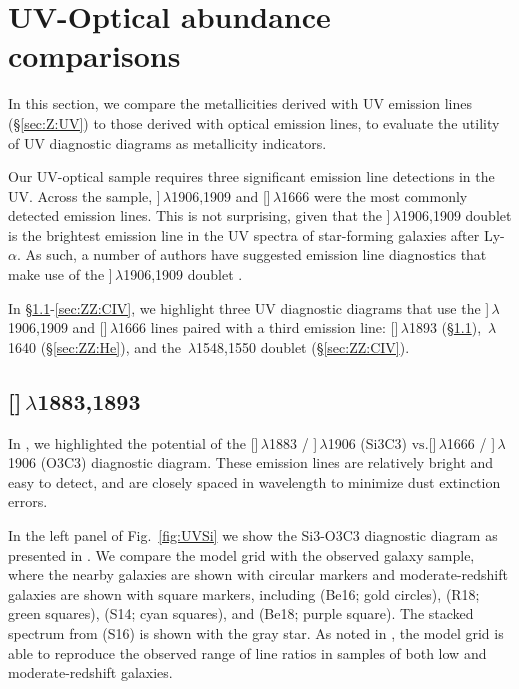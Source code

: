 \documentclass[trackchanges, preprint2]{aastex62}
\newcommand{\oiii}{[\ion{O}{3}]}
\newcommand{\heii}{\ion{He}{2}}
\newcommand{\civ}{\ion{C}{4}}
\newcommand{\SiuIII}{[\ion{Si}{3}]}
\newcommand{\ciii}{\ion{C}{3}]}
\newcommand\vs{\ensuremath{\mathrm{vs.}}\xspace}
\begin{document}
\section{UV-Optical abundance comparisons}\label{sec:ZZ}

In this section, we compare the metallicities derived with UV emission lines (\S\ref{sec:Z:UV}) to those derived with optical emission lines, to evaluate the utility of UV diagnostic diagrams as metallicity indicators.

Our UV-optical sample requires three significant emission line detections in the UV. Across the sample, \ciii$\,\lambda$1906,1909 and \oiii$\,\lambda$1666 were the most commonly detected emission lines. This is not surprising, given that the \ciii$\,\lambda$1906,1909 doublet is the brightest emission line in the UV spectra of star-forming galaxies after Ly-$\alpha$. As such, a number of authors have suggested emission line diagnostics that make use of the \ciii$\,\lambda$1906,1909 doublet \citep[e.g.,][]{Feltre+2016, Jaskot+2016, Byler+2018}.

In \S\ref{sec:ZZ:Si}-\ref{sec:ZZ:CIV}, we highlight three UV diagnostic diagrams that use the \ciii$\,\lambda$1906,1909 and \oiii$\,\lambda$1666 lines paired with a third emission line: \SiuIII$\,\lambda$1893 (\S\ref{sec:ZZ:Si}), \heii$\,\lambda$1640 (\S\ref{sec:ZZ:He}), and the \civ$\,\lambda$1548,1550 doublet (\S\ref{sec:ZZ:CIV}).

\subsection{\SiuIII$\,\lambda$1883,1893}\label{sec:ZZ:Si}

In , we highlighted the potential of the \SiuIII$\,\lambda$1883 / \ciii$\,\lambda$1906 (Si3C3) \vs \oiii$\,\lambda$1666 / \ciii$\,\lambda$1906 (O3C3) diagnostic diagram. These emission lines are relatively bright and easy to detect, and are closely spaced in wavelength to minimize dust extinction errors.

In the left panel of Fig.~\ref{fig:UVSi} we show the Si3-O3C3 diagnostic diagram as presented in . We compare the model grid with the observed galaxy sample, where the nearby galaxies are shown with circular markers and moderate-redshift galaxies are shown with square markers, including \citealt{Berg+2016} (Be16; gold circles), \citealt{Rigby+2018b} (R18; green squares), \citealt{Stark+2014} (S14; cyan squares), and \citealt{Berg+2018} (Be18; purple square). The stacked spectrum from \citealt{Steidel+2016} (S16) is shown with the gray star. As noted in , the model grid is able to reproduce the observed range of line ratios in samples of both low and moderate-redshift galaxies.
\end{document}
